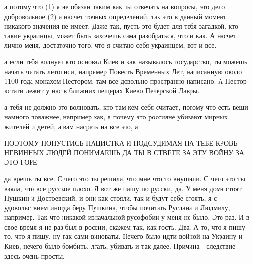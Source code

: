  
 
 
 
 




а потому что (1) я не обязан таким как ты отвечать на вопросы, это дело
добровольное (2) а насчет точных определений, так это в данный момент никакого
значения не имеет. Даже так, пусть это будет для тебя загадкой, кто такие
украинцы, может быть захочешь сама разобраться, что и как. А насчет лично меня,
достаточно того, что я считаю себя украинцем, вот и все.

а если тебя волнует кто основал Киев и как называлось государство, ты можешь
начать читать летописи, например Повесть Временных Лет, написанную около 1100
года монахом Нестором, там все довольно пространно написано. А Нестор кстати
лежит у нас в ближних пещерах Киево Печерской Лавры.

а тебя не должно это волновать, кто там кем себя считает, потому что есть вещи
намного поважнее, например как, а почему это россияне убивают мирных жителей и
детей, а вам насрать на все это, а

ПОЭТОМУ ПОПУСТИСЬ НАЦИСТКА И ПОДСУДИМАЯ НА ТЕБЕ КРОВЬ НЕВИННЫХ ЛЮДЕЙ ПОНИМАЕШЬ
ДА ТЫ В ОТВЕТЕ ЗА ЭТУ ВОЙНУ ЗА ЭТО ГОРЕ

да врешь ты все. С чего это ты решила, что мне что то внушили. С чего это ты
взяла, что все русское плохо. Я вот же пишу по русски, да. У меня дома стоят
Пушкин и Достоевский, и они как стояли, так и будут себе стоять, я с
удовольствием иногда беру Пушкина, чтобы почитать Руслана и Людмилу, например.
Так что никакой изначальной русофобии у меня не было. Это раз. И в свое время я
не раз был в россии, скажем так, как гость. Два. А то, что я пишу то, что я
пишу, ну так сами виноваты. Нечего было идти войной на Украину и Киев, нечего
было бомбить, лгать, убивать и так далее. Причина - следствие здесь очень
просты.

